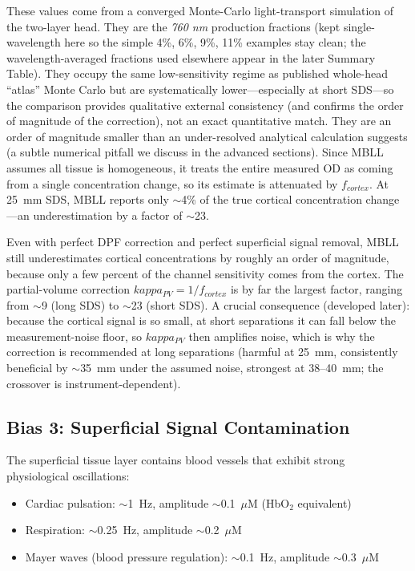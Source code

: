 \documentclass[12pt]{article}
\def\kappa{kappa}%
\def\text#1{#1}%
\def\,{ }%
\begin{document}
These values come from a converged Monte-Carlo light-transport simulation of the two-layer head. They are the \emph{760\,nm} production fractions (kept single-wavelength here so the simple 4\%, 6\%, 9\%, 11\% examples stay clean; the wavelength-averaged fractions used elsewhere appear in the later Summary Table). They occupy the same low-sensitivity regime as published whole-head ``atlas'' Monte Carlo but are systematically lower---especially at short SDS---so the comparison provides qualitative external consistency (and confirms the order of magnitude of the correction), not an exact quantitative match. They are an order of magnitude smaller than an under-resolved analytical calculation suggests (a subtle numerical pitfall we discuss in the advanced sections). Since MBLL assumes all tissue is homogeneous, it treats the entire measured OD as coming from a single concentration change, so its estimate is attenuated by $f_{\text{cortex}}$. At 25~mm SDS, MBLL reports only $\sim$4\% of the true cortical concentration change---an underestimation by a factor of $\sim$23.

\begin{keyinsight}
Even with perfect DPF correction and perfect superficial signal removal, MBLL still underestimates cortical concentrations by roughly an order of magnitude, because only a few percent of the channel sensitivity comes from the cortex. The partial-volume correction $\kappa_{\text{PV}} = 1/f_{\text{cortex}}$ is by far the largest factor, ranging from $\sim$9 (long SDS) to $\sim$23 (short SDS). A crucial consequence (developed later): because the cortical signal is so small, at short separations it can fall below the measurement-noise floor, so $\kappa_{\text{PV}}$ then amplifies noise, which is why the correction is recommended at long separations (harmful at 25~mm, consistently beneficial by $\sim$35~mm under the assumed noise, strongest at 38--40~mm; the crossover is instrument-dependent).
\end{keyinsight}

\subsection{Bias 3: Superficial Signal Contamination}

The superficial tissue layer contains blood vessels that exhibit strong physiological oscillations:

\begin{itemize}
\item Cardiac pulsation: $\sim$1~Hz, amplitude $\sim$0.1~$\mu$M (HbO$_2$ equivalent)
\item Respiration: $\sim$0.25~Hz, amplitude $\sim$0.2~$\mu$M
\item Mayer waves (blood pressure regulation): $\sim$0.1~Hz, amplitude $\sim$0.3~$\mu$M
\end{itemize}
\end{document}
